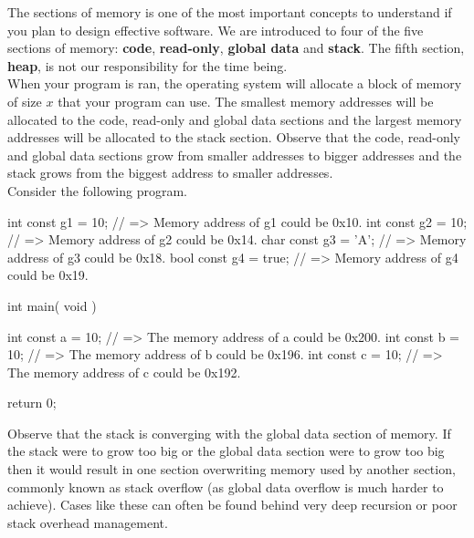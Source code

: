 

The sections of memory is one of the most important concepts to understand if you plan to design effective software. We are introduced to four of the five sections of memory: \textbf{code}, \textbf{read-only}, \textbf{global data} and \textbf{stack}. The fifth section, \textbf{heap}, is not our responsibility for the time being.\\

When your program is ran, the operating system will allocate a block of memory of size $x$ that your program can use. The smallest memory addresses will be allocated to the code, read-only and global data sections and the largest memory addresses will be allocated to the stack section. Observe that the code, read-only and global data sections grow from smaller addresses to bigger addresses and the stack grows from the biggest address to smaller addresses.\\

Consider the following program.\\

\begin{code}[c]
int const g1 = 10; // => Memory address of g1 could be 0x10.
int const g2 = 10; // => Memory address of g2 could be 0x14.
char const g3 = 'A'; // => Memory address of g3 could be 0x18.
bool const g4 = true; // => Memory address of g4 could be 0x19.

int main( void ) {
	int const a = 10; // => The memory address of a could be 0x200.
	int const b = 10; // => The memory address of b could be 0x196.
	int const c = 10; // => The memory address of c could be 0x192.
	
	return 0;
}
\end{code}

Observe that the stack is converging with the global data section of memory. If the stack were to grow too big or the global data section were to grow too big then it would result in one section overwriting memory used by another section, commonly known as stack overflow (as global data overflow is much harder to achieve). Cases like these can often be found behind very deep recursion or poor stack overhead management.


